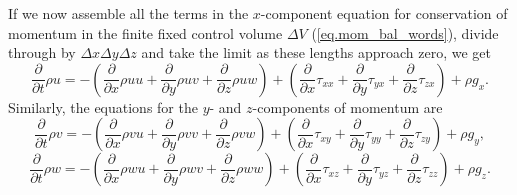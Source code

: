 \documentclass[twoside,11pt]		{report}
\begin{document}
If we now assemble all the terms in the $x$-component equation for
conservation of momentum in the finite fixed control volume $\Delta V$
(\ref{eq.mom_bal_words}), divide through by $\Delta x\Delta y\Delta z$
and take the limit as these lengths approach zero, we get
\begin{equation}
\frac{\partial}{\partial t}\rho u=
-\left(
\frac{\partial}{\partial x}\rho uu+
\frac{\partial}{\partial y}\rho uv+
\frac{\partial}{\partial z}\rho uw
\right)
+\left(
\frac{\partial}{\partial x}\tau_{xx}+
\frac{\partial}{\partial y}\tau_{yx}+
\frac{\partial}{\partial z}\tau_{zx}
\right)
+\rho g_x.
\end{equation}
Similarly, the equations for the $y$- and $z$-components of momentum are
\begin{equation}
\frac{\partial}{\partial t}\rho v=
-\left(
\frac{\partial}{\partial x}\rho vu+
\frac{\partial}{\partial y}\rho vv+
\frac{\partial}{\partial z}\rho vw
\right)
+\left(
\frac{\partial}{\partial x}\tau_{xy}+
\frac{\partial}{\partial y}\tau_{yy}+
\frac{\partial}{\partial z}\tau_{zy}
\right)
+\rho g_y,
\end{equation}
\begin{equation}
\frac{\partial}{\partial t}\rho w=
-\left(
\frac{\partial}{\partial x}\rho wu+
\frac{\partial}{\partial y}\rho wv+
\frac{\partial}{\partial z}\rho ww
\right)
+\left(
\frac{\partial}{\partial x}\tau_{xz}+
\frac{\partial}{\partial y}\tau_{yz}+
\frac{\partial}{\partial z}\tau_{zz}
\right)
+\rho g_z.
\end{equation}
\end{document}
